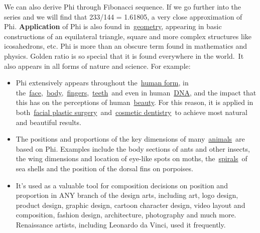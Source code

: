 \documentclass[12pt]{article}
\begin{document}
\vspace{\baselineskip}
{\fontsize{10pt}{12.0pt}\selectfont We can also derive Phi through Fibonacci sequence. If we go further into the series and we will find that 233/144 = 1.61805, a very close approximation of Phi.\textbf{ Application} of Phi is also found in \href{https://www.goldennumber.net/geometry/}{geometry}, appearing in basic constructions of an equilateral triangle, square and more complex structures like icosahedrons, etc. Phi is more than an obscure term found in mathematics and physics. Golden ratio is so special that it is found everywhere in the world. It also appears in all forms of nature and science. For example: \par}\par

\begin{itemize}
	\item {\fontsize{10pt}{12.0pt}\selectfont Phi extensively appears throughout the \href{https://www.goldennumber.net/life/}{human form}, in the \href{https://www.goldennumber.net/face/}{face}, \href{https://www.goldennumber.net/human-body/}{body}, \href{https://www.goldennumber.net/human-hand-foot/}{fingers}, \href{https://www.goldennumber.net/human-teeth/}{teeth} and even in human \href{https://www.goldennumber.net/dna/}{DNA}, and the impact that this has on the perceptions of human \href{https://www.goldennumber.net/beauty/}{beauty}. For this reason, it is applied in both \href{https://www.goldennumber.net/beauty/}{facial plastic surgery} and \href{https://www.goldennumber.net/human-teeth/}{cosmetic dentistry} to achieve most natural and beautiful results. \par}\par

	\item {\fontsize{10pt}{12.0pt}\selectfont The positions and proportions of the key dimensions of many \href{https://www.goldennumber.net/nature/}{animals} are based on Phi. Examples include the body sections of ants and other insects, the wing dimensions and location of eye-like spots on moths, the \href{https://www.goldennumber.net/spirals/}{spirals} of sea shells and the position of the dorsal fins on porpoises.  \par}\par

	\item {\fontsize{10pt}{12.0pt}\selectfont It’s used as a valuable tool for composition decisions on position and proportion in ANY branch of the design arts, including art, logo design, product design, graphic design, cartoon character design, video layout and composition, fashion design, architecture, photography and much more. Renaissance artists, including Leonardo da Vinci, used it frequently. \par}\par


\end{itemize}
\end{document}
